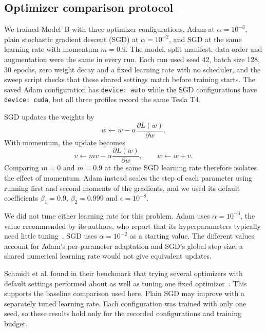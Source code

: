 \subsection{Optimizer comparison protocol}
\label{sec:optimizer-comparison}

We trained Model~B with three optimizer configurations, Adam at
$\alpha=10^{-3}$, plain stochastic gradient descent (SGD) at
$\alpha=10^{-2}$, and SGD at the same learning rate with momentum $m=0.9$.
The model, split manifest, data order and augmentation were the same in every
run.  Each run used seed 42, batch size 128, 30 epochs, zero weight decay and
a fixed learning rate with no scheduler, and the sweep script checks that
these shared settings match before training starts.  The saved Adam
configuration has \texttt{device: auto} while the SGD configurations have
\texttt{device: cuda}, but all three profiles record the same Tesla T4.

SGD updates the weights by
\begin{equation}
  w \leftarrow w-\alpha\frac{\partial L(w)}{\partial w}.
\end{equation}
With momentum, the update becomes
\begin{equation}
  v \leftarrow mv-\alpha\frac{\partial L(w)}{\partial w},
  \qquad w \leftarrow w+v.
\end{equation}
Comparing $m=0$ and $m=0.9$ at the same SGD learning rate therefore isolates
the effect of momentum.  Adam instead scales the step of each parameter using
running first and second moments of the gradients, and we used its default
coefficients $\beta_1=0.9$, $\beta_2=0.999$ and $\epsilon=10^{-8}$.

We did not tune either learning rate for this problem.  Adam uses
$\alpha=10^{-3}$, the value recommended by its authors, who report that its
hyperparameters typically need little tuning~\cite{kingma2015adam}.  SGD
uses $\alpha=10^{-2}$ as a starting value.  The different values account for
Adam's per-parameter adaptation and SGD's global step size; a shared numerical
learning rate would not give equivalent updates.

Schmidt et al. found in their benchmark that trying several optimizers with
default settings performed about as well as tuning one fixed
optimizer~\cite{schmidt2021descending}.  This supports the baseline comparison
used here.  Plain SGD may improve with a separately tuned learning rate.
Each configuration was trained with only one seed, so these results hold
only for the recorded configurations and training budget.

